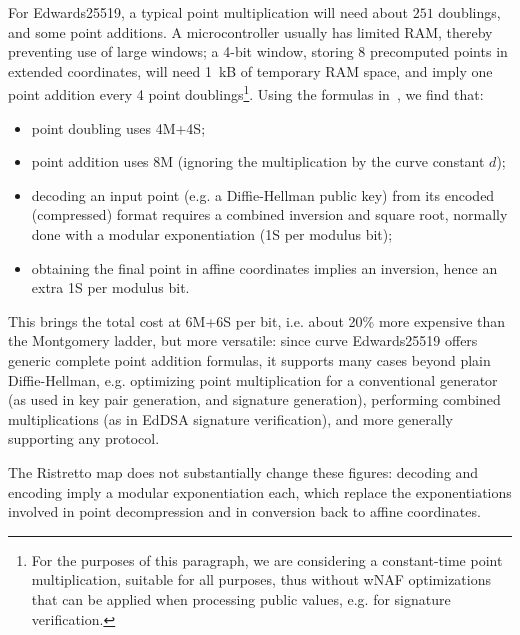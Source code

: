 \documentclass{llncs}
\begin{document}
For Edwards25519, a typical point multiplication will need about $251$
doublings, and some point additions. A microcontroller usually has
limited RAM, thereby preventing use of large windows; a 4-bit window,
storing 8 precomputed points in extended coordinates, will need 1~kB of
temporary RAM space, and imply one point addition every 4 point
doublings\footnote{For the purposes of this paragraph, we are
considering a constant-time point multiplication, suitable for all
purposes, thus without wNAF optimizations that can be applied when
processing public values, e.g. for signature verification.}. Using the
formulas in~\cite{EdDSArfc8032}, we find that:
\begin{itemize}

    \item point doubling uses 4M+4S;

    \item point addition uses 8M (ignoring the multiplication by the
    curve constant $d$);

    \item decoding an input point (e.g. a Diffie-Hellman public key)
    from its encoded (com\-pres\-sed) format requires a combined
    inversion and square root, normally done with a modular
    exponentiation (1S per modulus bit);

    \item obtaining the final point in affine coordinates implies an
    inversion, hence an extra 1S per modulus bit.

\end{itemize}
This brings the total cost at 6M+6S per bit, i.e. about 20\% more
expensive than the Montgomery ladder, but more versatile: since curve
Edwards25519 offers generic complete point addition formulas, it
supports many cases beyond plain Diffie-Hellman, e.g. optimizing point
multiplication for a conventional generator (as used in key pair
generation, and signature generation), performing combined
multiplications (as in EdDSA signature verification), and more generally
supporting any protocol.

The Ristretto map does not substantially change these figures: decoding
and encoding imply a modular exponentiation each, which replace the
exponentiations involved in point decompression and in conversion back
to affine coordinates.
\end{document}
